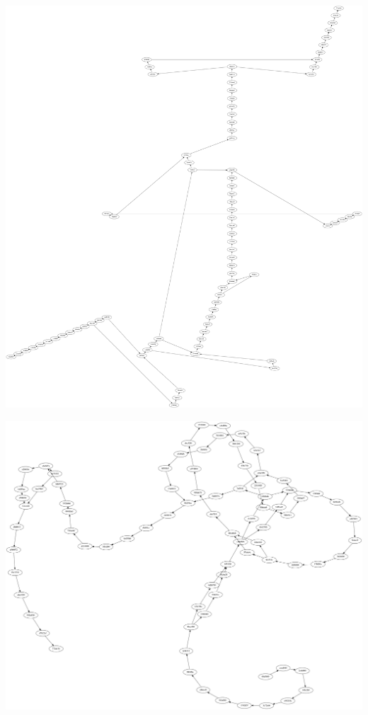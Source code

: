 \documentclass[cjk,dvipdfmx,20pt]{beamer}
\begin{document}
\begin{frame}{}
\begin{center}
\includegraphics[width=0.8\hsize]{image200812/git-twopi.png}
\end{center}
\end{frame}

\begin{frame}{}
\begin{center}
\includegraphics[width=0.8\hsize]{image200812/git-fdp.png}
\end{center}
\end{frame}
\end{document}
